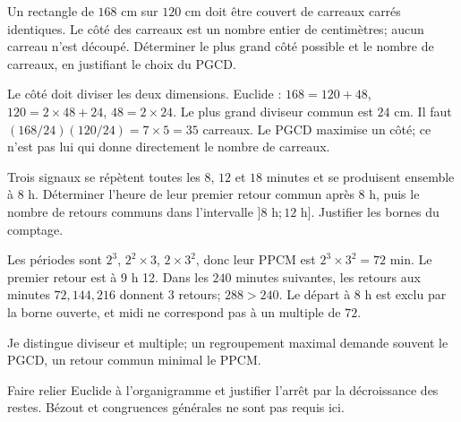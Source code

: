 \label{t11s-c10-p01}
Un rectangle de $168$ cm sur $120$ cm doit être couvert de carreaux carrés identiques. Le côté des carreaux est un nombre entier de centimètres; aucun carreau n’est découpé. Déterminer le plus grand côté possible et le nombre de carreaux, en justifiant le choix du PGCD.
\begin{corrige}\label{sol-t11s-c10-p01}
Le côté doit diviser les deux dimensions. Euclide : $168=120+48$, $120=2\times48+24$, $48=2\times24$. Le plus grand diviseur commun est $24$ cm. Il faut $(168/24)(120/24)=7\times5=35$ carreaux. Le PGCD maximise un côté; ce n’est pas lui qui donne directement le nombre de carreaux.
\end{corrige}
\label{t11s-c10-p02}
Trois signaux se répètent toutes les $8$, $12$ et $18$ minutes et se produisent ensemble à 8 h. Déterminer l’heure de leur premier retour commun après 8 h, puis le nombre de retours communs dans l’intervalle $]8\text{ h};12\text{ h}]$. Justifier les bornes du comptage.
\begin{corrige}\label{sol-t11s-c10-p02}
Les périodes sont $2^3$, $2^2\times3$, $2\times3^2$, donc leur PPCM est $2^3\times3^2=72$ min. Le premier retour est à 9 h 12. Dans les $240$ minutes suivantes, les retours aux minutes $72,144,216$ donnent $3$ retours; $288>240$. Le départ à 8 h est exclu par la borne ouverte, et midi ne correspond pas à un multiple de $72$.
\end{corrige}

\begin{jemeteste}Je distingue diviseur et multiple; un regroupement maximal demande souvent le PGCD, un retour commun minimal le PPCM.\end{jemeteste}
\begin{notepourlaclasse}Faire relier Euclide à l’organigramme et justifier l’arrêt par la décroissance des restes. Bézout et congruences générales ne sont pas requis ici.\end{notepourlaclasse}
